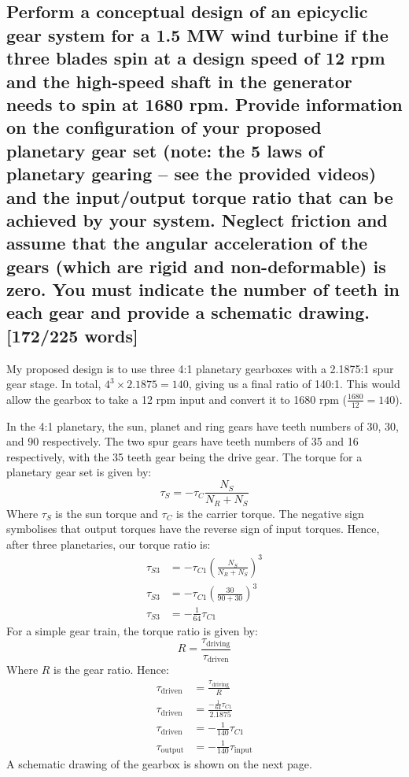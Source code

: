 \documentclass[12pt]{article}
\numberwithin{equation}{section}
\begin{document}
\begin{flushleft}
\subsection[Schematic.]{Perform a conceptual design of an epicyclic gear system for a 1.5 MW wind turbine if the three blades spin at a design speed of 12 rpm and the high-speed shaft in the generator needs to spin at 1680 rpm. Provide information on the configuration of your proposed planetary gear set (note: the 5 laws of planetary gearing – see the provided videos) and the input/output torque ratio that can be achieved by your system. Neglect friction and assume that the angular acceleration of the gears (which are rigid and non-deformable) is zero. You must indicate the number of teeth in each gear and provide a schematic drawing. [172/225 words]}
My proposed design is to use three 4:1 planetary gearboxes with a 2.1875:1 spur gear stage. In total, $4^3 \times 2.1875 = 140$, giving us a final ratio of 140:1. This would allow the gearbox to take a 12 rpm input and convert it to 1680 rpm ($\frac{1680}{12} = 140$).

In the 4:1 planetary, the sun, planet and ring gears have teeth numbers of 30, 30, and 90 respectively. The two spur gears have teeth numbers of 35 and 16 respectively, with the 35 teeth gear being the drive gear. The torque for a planetary gear set is given by:
\begin{equation}
  \tau_S = - \tau_C \frac{N_S}{N_R + N_S}
\end{equation}
Where $\tau_S$ is the sun torque and $\tau_C$ is the carrier torque. The negative sign symbolises that output torques have the reverse sign of input torques.
Hence, after three planetaries, our torque ratio is:
\begin{align}
  \tau_{S3} &= - \tau_{C1} \left( \frac{N_S}{N_R + N_S} \right)^3\\
  \tau_{S3} &= - \tau_{C1} \left( \frac{30}{90 + 30} \right)^3\\
  \tau_{S3} &= - \frac{1}{64}\tau_{C1} 
\end{align}
For a simple gear train, the torque ratio is given by:
\begin{equation}
  R = \frac{\tau_{\textrm{driving}}}{\tau_{\textrm{driven}}}
\end{equation}
Where $R$ is the gear ratio. Hence:
\begin{align}
  \tau_{\textrm{driven}} &= \frac{\tau_{\textrm{driving}}}{R}\\
  \tau_{\textrm{driven}} &= \frac{- \frac{1}{64}\tau_{C1} }{2.1875}\\
  \tau_{\textrm{driven}} &= -\frac{1}{140} \tau_{C1}\\
  \tau_{\textrm{output}} &= -\frac{1}{140} \tau_{\textrm{input}}
\end{align}
A schematic drawing of the gearbox is shown on the next page.
\newpage
\setcounter{page}{11}

\end{flushleft}
\end{document}
